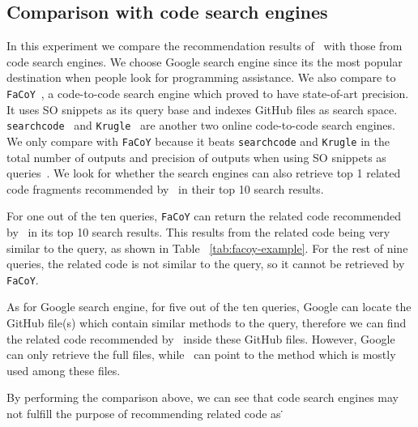 \subsection{Comparison with code search engines}
In this experiment we compare the recommendation results of \tool\ with those from code search engines. We choose Google search engine since its the most popular destination when people look for programming assistance. We also compare to \texttt{FaCoY}~\cite{kim2018Facoy}, a code-to-code search engine which proved to have state-of-art precision. It uses SO snippets as its query base and indexes GitHub files as search space. \texttt{searchcode}~\cite{searchcode} and \texttt{Krugle}~\cite{krugle} are another two online code-to-code search engines. We only compare with \texttt{FaCoY} because it beats \texttt{searchcode} and \texttt{Krugle} in the total number of outputs and precision of outputs when using SO snippets as queries~\cite{kim2018Facoy}. 
We look for whether the search engines can also retrieve top 1 related code fragments recommended by \tool\ in their top 10 search results. 

For one out of the ten queries, \texttt{FaCoY} can return the related code recommended by \tool\ in its top 10 search results. This results from the related code being very similar to the query, as shown in Table ~\ref{tab:facoy-example}. For the rest of nine queries, the related code is not similar to the query, so it cannot be retrieved by \texttt{FaCoY}.

As for Google search engine, for five out of the ten queries, Google can locate the GitHub file(s) which contain similar methods to the query, therefore we can find the related code recommended by \tool\ inside these GitHub files. However, Google can only retrieve the full files, while \tool\ can point to the method which is mostly used among these files. 

By performing the comparison above, we can see that code search engines may not fulfill the purpose of recommending related code as \tool\.


